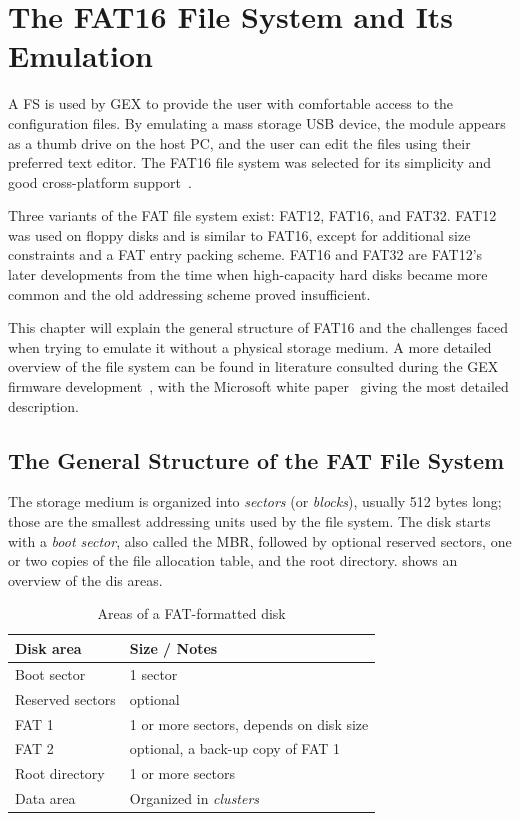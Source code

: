 \chapter{The FAT16 File System and Its Emulation} \label{sec:fat16}

A \gls{FS} is used by GEX to provide the user with comfortable access to the configuration files. By emulating a mass storage \gls{USB} device, the module appears as a thumb drive on the host \gls{PC}, and the user can edit the files using their preferred text editor. The FAT16 file system was selected for its simplicity and good cross-platform support~\cite{os-support-table}.

Three variants of the \gls{FAT} file system exist: FAT12, FAT16, and FAT32. FAT12 was used on floppy disks and is similar to FAT16, except for additional size constraints and a \gls{FAT} entry packing scheme. FAT16 and FAT32 are FAT12's later developments from the time when high-capacity hard disks became more common and the old addressing scheme proved insufficient.

This chapter will explain the general structure of FAT16 and the challenges faced when trying to emulate it without a physical storage medium. A more detailed overview of the file system can be found in literature consulted during the GEX firmware development~\cite{ms-fat,fat16-brainy,fat16-maverick,fat16-phobos,fat-whitepaper}, with the Microsoft white paper~\cite{fat-whitepaper} giving the most detailed description.

\section{The General Structure of the FAT File System}

The storage medium is organized into \textit{sectors} (or \textit{blocks}), usually 512 bytes long; those are the smallest addressing units used by the file system. The disk starts with a \textit{boot sector}, also called the \gls{MBR}, followed by optional reserved sectors, one or two copies of the file allocation table, and the root directory.  shows an overview of the dis areas.

\begin{table}[H]
	\centering
	\begin{tabular}{ll}
		\toprule
		\textbf{Disk area} & \textbf{Size / Notes} \\
		\midrule
		Boot sector & 1 sector \\
		Reserved sectors & optional \\
		FAT 1 & 1 or more sectors, depends on disk size \\
		FAT 2 & optional, a back-up copy of FAT 1 \\
		Root directory & 1 or more sectors \\
		Data area & Organized in \textit{clusters} \\
		\bottomrule
	\end{tabular}
	\caption{\label{tab:fat16_disk_areas}Areas of a FAT-formatted disk}
\end{table}

